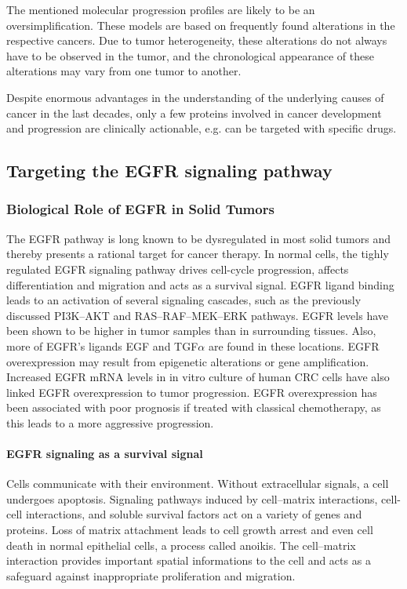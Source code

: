 {{      The mentioned molecular progression profiles are likely to be an
      oversimplification. These models are based on frequently found alterations
      in the respective cancers. Due to tumor heterogeneity, these alterations
      do not always have to be observed in the tumor, and the chronological
      appearance of these alterations may vary from one tumor to another.

      Despite enormous advantages in the understanding of the underlying causes
      of cancer in the last decades, only a few proteins involved in cancer
      development and progression are clinically actionable, e.g. can be
      targeted with specific drugs.

  \subsection{Targeting the EGFR signaling pathway}

    \subsubsection{Biological Role of EGFR in Solid Tumors}

      The EGFR pathway is long known to be dysregulated in most solid tumors
      and thereby presents a rational target for cancer therapy.
      In normal cells, the tighly regulated EGFR signaling pathway drives
      cell-cycle progression, affects differentiation and migration and acts as
      a survival signal. EGFR ligand binding leads to an activation of several
      signaling cascades, such as the previously discussed PI3K--AKT and
      RAS--RAF--MEK--ERK pathways. EGFR levels have been shown to be
      higher in tumor samples than in surrounding tissues. Also, more of EGFR's
      ligands EGF and TGF$\alpha$ are found in these locations. EGFR
      overexpression may result from epigenetic alterations or gene
      amplification. Increased EGFR mRNA levels in in vitro culture of human CRC
      cells have also linked EGFR overexpression to tumor progression. EGFR
      overexpression has been associated with poor prognosis if treated with
      classical chemotherapy, as this leads to a more aggressive progression.

      \paragraph{EGFR signaling as a survival signal}

        Cells communicate with their environment. Without extracellular signals,
        a cell undergoes apoptosis. Signaling pathways induced by cell--matrix
        interactions, cell-cell interactions, and soluble survival factors act
        on a variety of genes and proteins. Loss of matrix attachment leads to
        cell growth arrest and even cell death in normal epithelial cells, a
        process called anoikis. The cell--matrix interaction provides important
        spatial informations to the cell and acts as a safeguard against
        inappropriate proliferation and migration.

}}
